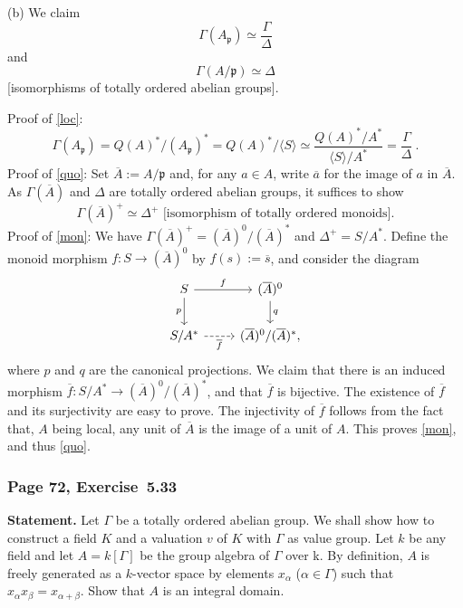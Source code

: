 \documentclass[12pt,letterpaper]{article}%
\newcommand{\mf}{\mathfrak}
\newcommand{\ppp}{\mf p}
\newcommand{\nn}{\noindent}
\begin{document}
\nn(b) We claim 
\begin{equation}\label{loc}
\Gamma(A_\ppp)\simeq\frac{\Gamma}{\Delta}
\end{equation}
and 
\begin{equation}\label{quo}
\Gamma(A/\ppp)\simeq\Delta
\end{equation}
[isomorphisms of totally ordered abelian groups].

\nn Proof of \eqref{loc}:
$$
\Gamma(A_\ppp)=Q(A)^*/(A_\ppp)^*=Q(A)^*/\langle S\rangle\simeq\frac{Q(A)^*/A^*}{\langle S\rangle/A^*}=\frac{\Gamma}{\Delta}\ .
$$ 
Proof of \eqref{quo}: Set $\overline A:=A/\ppp$ and, for any $a\in A$, write $\overline a$ for the image of $a$ in $\overline A$. As $\Gamma(\overline A)$ and $\Delta$ are totally ordered abelian groups, it suffices to show 
\begin{equation}\label{mon}
\Gamma(\overline A)^+\simeq\Delta^+\text{ [isomorphism of totally ordered monoids].}
\end{equation}
Proof of \eqref{mon}: We have $\Gamma(\overline A)^+=(\overline A)^0/(\overline A)^*$ and $\Delta^+=S/A^*$. Define the monoid morphism $f:S\to(\overline A)^0$ by $f(s):=\overline s$, and consider the diagram 
$$
\begin{tikzcd}
S\ar[r,"f"]\ar[d,"p"']&(\overline A)^0\ar[d,"q"]\\ 
S/A^*\ar[r,dashrightarrow,"\overline f"']&(\overline A)^0/(\overline A)^*,
\end{tikzcd}
$$ 
where $p$ and $q$ are the canonical projections. We claim that there is an induced morphism $\overline f:S/A^*\to(\overline A)^0/(\overline A)^*$, and that $\overline f$ is bijective. The existence of $\overline f$ and its surjectivity are easy to prove. The injectivity of $\overline f$ follows from the fact that, $A$ being local, any unit of $\overline A$ is the image of a unit of $A$. This proves \eqref{mon}, and thus \eqref{quo}.

\subsubsection{Page 72, Exercise~5.33}%

\textbf{Statement.} Let $\Gamma$ be a totally ordered abelian group. We shall show how to construct a field $K$ and a valuation $v$ of $K$ with $\Gamma$ as value group. Let $k$ be any field and let $A=k[\Gamma]$ be the group algebra of $\Gamma$ over k. By definition, $A$ is freely generated as a $k$-vector space by elements $x_\alpha$ ($\alpha\in\Gamma$) such that $x_\alpha x_\beta= x_{\alpha+\beta}$. Show that $A$ is an integral domain.
\end{document}
